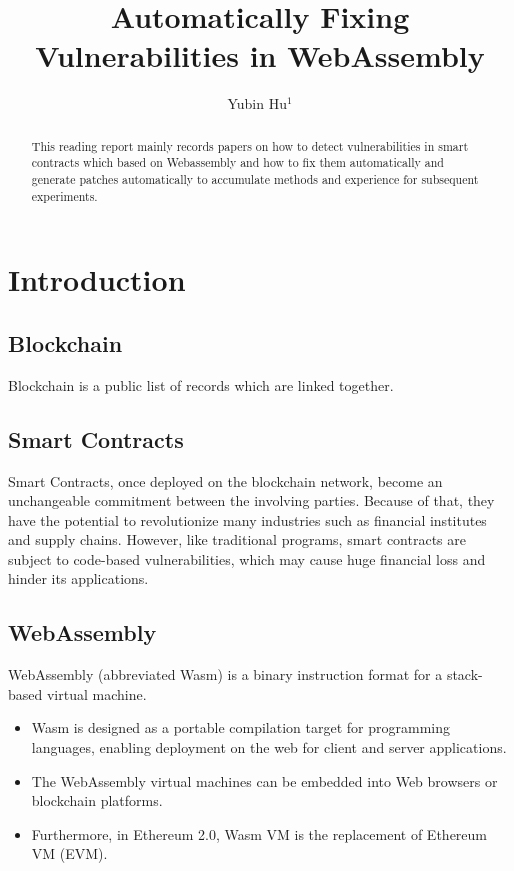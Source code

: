 \documentclass[a4paper, 10pt, conference, twocolumn]{ieeeconf}       %
\title{\LARGE \bf
Automatically Fixing Vulnerabilities in WebAssembly
}
\author{Yubin Hu$^{1}$ %
}
\begin{document}
\maketitle
\thispagestyle{empty}
\pagestyle{empty}


\begin{abstract}

This reading report mainly records papers on how to detect vulnerabilities in smart contracts which based on Webassembly and how to fix them automatically and generate patches automatically to accumulate methods and experience for subsequent experiments.

\end{abstract}


\section{Introduction}

\subsection{Blockchain}

Blockchain is a public list of records which are linked together.

\subsection{Smart Contracts}

Smart Contracts, once deployed on the blockchain network, become an unchangeable commitment between the involving parties. 
Because of that, they have the potential to revolutionize many industries such as financial institutes and supply chains.
However, like traditional programs, smart contracts are subject to code-based vulnerabilities, which may cause huge financial loss and hinder its applications.

\subsection{WebAssembly}

WebAssembly (abbreviated Wasm) is a binary instruction format for a stack-based virtual machine.

\begin{itemize}
    \item Wasm is designed as a portable compilation target for programming languages, enabling deployment on the web for client and server applications.
    \item The WebAssembly virtual machines can be embedded into Web browsers or blockchain platforms.
    \item Furthermore, in Ethereum 2.0, Wasm VM is the replacement of Ethereum VM (EVM).
\end{itemize}
\end{document}
